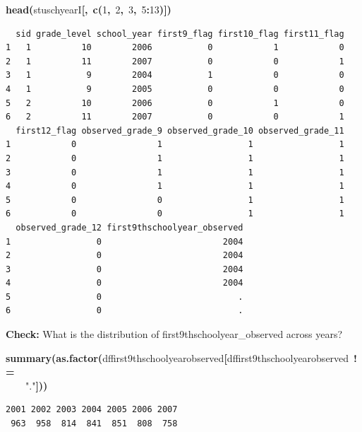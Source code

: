 \documentclass[12pt]{article}
\makeatletter
\newcommand{\hlnumber}[1]{\textcolor[rgb]{0,0,0}{#1}}%
\newcommand{\hlfunctioncall}[1]{\textcolor[rgb]{0.501960784313725,0,0.329411764705882}{\textbf{#1}}}%
\newcommand{\hlstring}[1]{\textcolor[rgb]{0.6,0.6,1}{#1}}%
\newcommand{\hlkeyword}[1]{\textcolor[rgb]{0,0,0}{\textbf{#1}}}%
\newcommand{\hlsymbol}[1]{\textcolor[rgb]{0,0,0}{#1}}%
\newcommand{\hlstd}[1]{\textcolor[rgb]{0,0,0}{#1}}%
\newenvironment{kframe}{%
 \def\FrameCommand##1{\hskip\@totalleftmargin \hskip-\fboxsep
 \colorbox{shadecolor}{##1}\hskip-\fboxsep
     \hskip-\linewidth \hskip-\@totalleftmargin \hskip\columnwidth}%
 \MakeFramed {\advance\hsize-\width
   \@totalleftmargin\z@ \linewidth\hsize
   \@setminipage}}%
 {\par\unskip\endMakeFramed}
\newenvironment{knitrout}{}{} %
\renewenvironment{knitrout}{\begin{footnotesize}}{\end{footnotesize}}
\makeatother
\begin{document}
\begin{knitrout}
\begin{kframe}
\begin{flushleft}
\hlstd{}\hlfunctioncall{head}\hlkeyword{(}\hlsymbol{stuschyearI}\hlkeyword{[}\hlkeyword{,}{\ }\hlfunctioncall{c}\hlkeyword{(}\hlnumber{1}\hlkeyword{,}{\ }\hlnumber{2}\hlkeyword{,}{\ }\hlnumber{3}\hlkeyword{,}{\ }\hlnumber{5}\hlkeyword{:}\hlnumber{13}\hlkeyword{)}\hlkeyword{]}\hlkeyword{)}\mbox{}
\normalfont
\end{flushleft}
\begin{verbatim}
  sid grade_level school_year first9_flag first10_flag first11_flag
1   1          10        2006           0            1            0
2   1          11        2007           0            0            1
3   1           9        2004           1            0            0
4   1           9        2005           0            0            0
5   2          10        2006           0            1            0
6   2          11        2007           0            0            1
  first12_flag observed_grade_9 observed_grade_10 observed_grade_11
1            0                1                 1                 1
2            0                1                 1                 1
3            0                1                 1                 1
4            0                1                 1                 1
5            0                0                 1                 1
6            0                0                 1                 1
  observed_grade_12 first9thschoolyear_observed
1                 0                        2004
2                 0                        2004
3                 0                        2004
4                 0                        2004
5                 0                           .
6                 0                           .
\end{verbatim}
\end{kframe}
\end{knitrout}


\textbf{Check:} What is the distribution of first9thschoolyear\_observed across years?

\begin{knitrout}
\color{fgcolor}\begin{kframe}
\begin{flushleft}
\ttfamily\noindent
\hlfunctioncall{summary}\hlkeyword{(}\hlfunctioncall{as.factor}\hlkeyword{(}\hlsymbol{df}\hlkeyword{\usebox{\hlnormalsizeboxdollar}}\hlsymbol{first9thschoolyear\usebox{\hlnormalsizeboxunderscore}observed}\hlkeyword{[}\hlsymbol{df}\hlkeyword{\usebox{\hlnormalsizeboxdollar}}\hlsymbol{first9thschoolyear\usebox{\hlnormalsizeboxunderscore}observed}{\ }\hlkeyword{!=}\hspace*{\fill}\\
\hlstd{}{\ }{\ }{\ }{\ }\hlstring{"{}."{}}\hlkeyword{]}\hlkeyword{)}\hlkeyword{)}\mbox{}
\normalfont
\end{flushleft}
\begin{verbatim}
2001 2002 2003 2004 2005 2006 2007 
 963  958  814  841  851  808  758 
\end{verbatim}
\end{kframe}
\end{knitrout}
\end{document}
